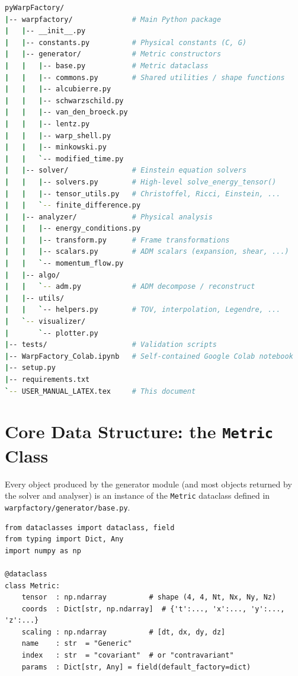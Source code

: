 \documentclass[11pt, a4paper, twoside]{report}
\begin{document}
\begin{lstlisting}[language=bash, caption={Repository layout}]
pyWarpFactory/
|-- warpfactory/              # Main Python package
|   |-- __init__.py
|   |-- constants.py          # Physical constants (C, G)
|   |-- generator/            # Metric constructors
|   |   |-- base.py           # Metric dataclass
|   |   |-- commons.py        # Shared utilities / shape functions
|   |   |-- alcubierre.py
|   |   |-- schwarzschild.py
|   |   |-- van_den_broeck.py
|   |   |-- lentz.py
|   |   |-- warp_shell.py
|   |   |-- minkowski.py
|   |   `-- modified_time.py
|   |-- solver/               # Einstein equation solvers
|   |   |-- solvers.py        # High-level solve_energy_tensor()
|   |   |-- tensor_utils.py   # Christoffel, Ricci, Einstein, ...
|   |   `-- finite_difference.py
|   |-- analyzer/             # Physical analysis
|   |   |-- energy_conditions.py
|   |   |-- transform.py      # Frame transformations
|   |   |-- scalars.py        # ADM scalars (expansion, shear, ...)
|   |   `-- momentum_flow.py
|   |-- algo/
|   |   `-- adm.py            # ADM decompose / reconstruct
|   |-- utils/
|   |   `-- helpers.py        # TOV, interpolation, Legendre, ...
|   `-- visualizer/
|       `-- plotter.py
|-- tests/                    # Validation scripts
|-- WarpFactory_Colab.ipynb   # Self-contained Google Colab notebook
|-- setup.py
|-- requirements.txt
`-- USER_MANUAL_LATEX.tex     # This document
\end{lstlisting}

\section{Core Data Structure: the \texttt{Metric} Class}
\label{sec:metric_class}

Every object produced by the generator module (and most objects returned
by the solver and analyser) is an instance of the \texttt{Metric} dataclass
defined in \texttt{warpfactory/generator/base.py}.

\begin{lstlisting}[caption={Metric dataclass definition (simplified)}]
from dataclasses import dataclass, field
from typing import Dict, Any
import numpy as np

@dataclass
class Metric:
    tensor  : np.ndarray          # shape (4, 4, Nt, Nx, Ny, Nz)
    coords  : Dict[str, np.ndarray]  # {'t':..., 'x':..., 'y':..., 'z':...}
    scaling : np.ndarray          # [dt, dx, dy, dz]
    name    : str  = "Generic"
    index   : str  = "covariant"  # or "contravariant"
    params  : Dict[str, Any] = field(default_factory=dict)
\end{lstlisting}
\end{document}
